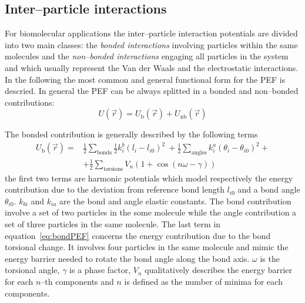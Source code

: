 \subsection{Inter--particle interactions}
For biomolecular applications the inter--particle interaction potentials are divided into two main classes: the
\textit{bonded interactions} involving particles within the same molecules and the \textit{non--bonded
interactions} engaging all particles in the system and which usually represent the Van der Waals and the
electrostatic interactions. In the following the most common and general functional form for the \ac{PEF} is
descried. In general the \ac{PEF} can be always splitted in a bonded and non--bonded contributions:
\begin{equation*}
	U(\vec r) = U_{\text{b}}(\vec r) + U_\text{nb}(\vec r)
	\label{eq:FFPEF}
\end{equation*}

The bonded contribution is generally described by the following terms
\begin{equation}
	\begin{aligned}
	U_{\text{b}}(\vec r) = &\frac{1}{2}\sum_{\text{bonds}} \frac{1}{2}k_i^b(l_i - l_{i0})^2\ + \frac{1}{2}\sum_{\text{angles}} k_i^a (\theta_i - \theta_{i0})^2 +\\
		 	& +\frac{1}{2}\sum_{\text{torsions}} V_n(1+\cos (n\omega - \gamma))
	\end{aligned}
	\label{eq:bondPEF}
\end{equation}
the first two terms are harmonic potentials which model respectively the energy contribution due to the deviation
from reference bond length $l_{i0}$ and a bond angle $\theta_{i0}$. $k_{bi}$ and $k_{ia}$ are the bond and angle
elastic constants. The bond contribution involve a set of two particles in the some molecule while the angle
contribution a set of three particles in the same molecule. The last term in equation~\eqref{eq:bondPEF} concerns
the energy contribution due to the bond torsional change. It involves four particles in the same molecule and
mimic the energy barrier needed to rotate the bond angle along the bond axis. $\omega$ is the torsional angle,
$\gamma$ is a phase factor, $V_n$ qualitatively describes the energy barrier for each $n$--th components and $n$
is defined as the number of minima for each components.

